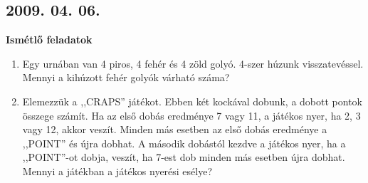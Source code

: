 \documentclass{article}
\begin{document}
\subsection*{2009. 04. 06.}
\bf{Ismétlő feladatok} \rm
\begin{enumerate}
\item Egy urnában van 4 piros, 4 fehér és 4 zöld golyó. 4-szer húzunk visszatevéssel. Mennyi a kihúzott fehér golyók várható száma?

\item Elemezzük a ,,CRAPS'' játékot. Ebben két kockával dobunk, a dobott pontok összege számít. 
Ha az első dobás eredménye 7 vagy 11, a játékos nyer, ha 2, 3 vagy 12, akkor veszít. Minden más esetben az első dobás eredménye a ,,POINT'' és újra dobhat. 
A második dobástól kezdve a játékos nyer,  ha a ,,POINT''-ot dobja, veszít, ha 7-est dob minden más esetben újra dobhat. Mennyi a játékban a játékos nyerési esélye?
\end{enumerate}
\end{document}
